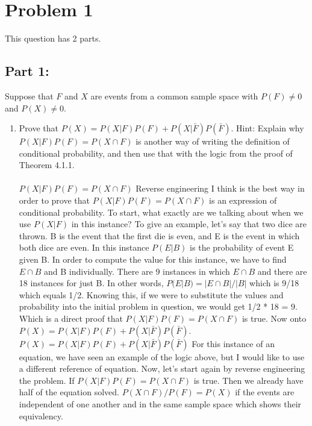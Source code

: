 \section*{Problem 1}
 \noindent
 This question has 2 parts.
 \subsection*{Part 1:}
 Suppose that $F$ and $X$ are events from a common sample space with $P(F) \neq 0$ and $P(X) \neq 0$.
 \\
 \begin{enumerate}[label=(\alph*)]
     \item Prove that $P(X) = P(X|F)P(F) + P(X|\bar{F})P(\bar{F})$. Hint: Explain why $P(X|F)P(F) = P(X \cap F)$ is another way of writing the definition of conditional probability, and then use that with the logic from the proof of Theorem 4.1.1.
     \\\\
     $P(X|F)P(F) = P(X \cap F)$ Reverse engineering I think is the best way in order to prove that $P(X|F)P(F) = P(X \cap F)$ is an expression of conditional probability. To start, what exactly are we talking about when we use $P(X|F)$ in this instance? To give an example, let's say that two dice are thrown. B is the event that the first die is even, and E is the event in which both dice are even. In this instance $P(E|B)$ is the probability of event E given B. In order to compute the value for this instance, we have to find $E \cap B$ and B individually. There are 9 instances in which $E \cap B$ and there are 18 instances for just B. In other words, $P(E|B) = |E \cap B|/|B|$ which is 9/18 which equals 1/2. Knowing this, if we were to substitute the values and probability into the initial problem in question, we would get 1/2 * 18 = 9. Which is a direct proof that $P(X|F)P(F) = P(X \cap F)$ is true. Now onto $P(X) = P(X|F)P(F) + P(X|\bar{F})P(\bar{F})$. 
     \\
     
     $P(X) = P(X|F)P(F) + P(X|\bar{F})P(\bar{F})$ For this instance of an equation, we have seen an example of the logic above, but I would like to use a different reference of equation. Now, let's start again by reverse engineering the problem. If $P(X|F)P(F) = P(X \cap F)$ is true. Then we already have half of the equation solved. $P(X \cap F)/P(F) = P(X)$ if the events are independent of one another and in the same sample space which shows their equivalency.
     \\
     

\end{enumerate}
